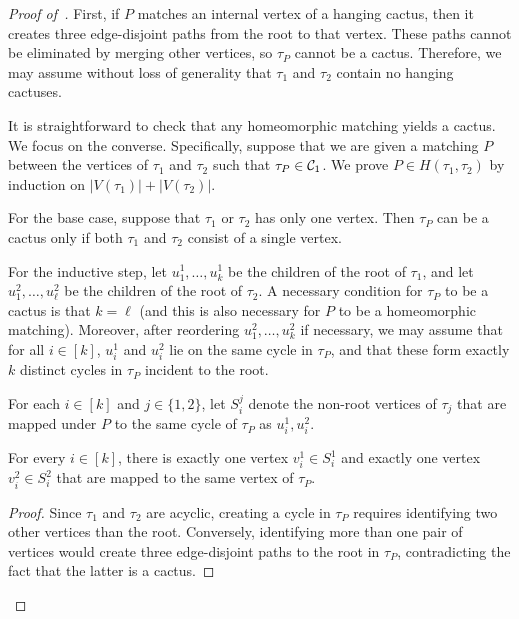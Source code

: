\begin{proof}[Proof of~]
    First, if $P$ matches an internal vertex of a hanging cactus, then it creates three edge-disjoint paths from the root to that vertex. These paths cannot be eliminated by merging other vertices, so $\tau_P$ cannot be a cactus.
    Therefore, we may assume without loss of generality that $\tau_1$ and $\tau_2$
    contain no hanging cactuses.

    It is straightforward to check that any homeomorphic matching yields a cactus. We focus on the converse. Specifically, suppose that we are
    given a matching $P$ between the vertices
    of $\tau_1$ and $\tau_2$ such that
    $\tau_P\in {\cal C}_1$. We prove 
    $P\in H(\tau_1, \tau_2)$ by induction
    on $|V(\tau_1)|+|V(\tau_2)|$.

    For the base case, suppose that $\tau_1$
    or $\tau_2$ has only one vertex. Then
    $\tau_P$ can be a cactus only if both
    $\tau_1$ and $\tau_2$ consist of a single
    vertex.

    For the inductive step, let $u^1_1, \ldots, u^1_k$
    be the children of the root of $\tau_1$,
    and let $u^2_1, \ldots, u^2_\ell$ be the children
    of the root of $\tau_2$. A necessary
    condition for $\tau_P$ to be a cactus is
    that $k=\ell$ (and this is also necessary for
    $P$ to be a homeomorphic matching).
    Moreover, after reordering $u^2_1, \ldots, u^2_k$ if necessary, we may assume that
    for all $i\in [k]$, $u^1_i$ and $u^2_i$ lie on the
    same cycle in $\tau_P$, and that these form
    exactly $k$ distinct cycles in $\tau_P$
    incident to the root. 
    
    For each $i\in [k]$
    and $j\in \{1,2\}$,
    let $S^j_i$ denote the non-root 
    vertices of $\tau_j$ that
    are mapped under $P$
    to the same cycle of $\tau_P$ as $u^1_i,u^2_i$.
    
    \begin{claim}\label{claim:inductive-number-mappings}
        For every $i\in [k]$, there is exactly
        one vertex $v^1_i\in S^1_i$ and exactly one vertex 
        $v^2_i\in S^2_i$ that
        are mapped to the same vertex of $\tau_P$.
    \end{claim}

    \begin{proof}
        Since $\tau_1$ and $\tau_2$ are acyclic,
        creating a cycle in $\tau_P$ requires
        identifying two other vertices than the
        root. Conversely, 
        identifying more than one pair of vertices
        would create
        three edge-disjoint paths to the root
        in $\tau_P$, contradicting the fact
        that the
        latter is a cactus.
    \end{proof}


\end{proof}
